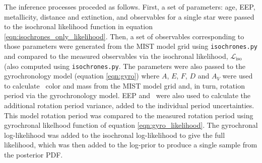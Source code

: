 The inference processes proceded as follows.
First, a set of parameters: age, EEP, metallicity, distance and extinction,
and observables for a single star were passed to the isochronal likelihood
function in equation \eqref{eqn:isochrones_only_likelihood}.
Then, a set of observables corresponding to those parameters were generated
from the MIST model grid using {\tt isochrones.py} and compared to the
measured observables via the isochronal likelihood,
$\mathcal{L}_{\mathrm{iso}}$ (also computed using {\tt isochrones.py}.
The parameters were also passed to the gyrochronology model (equation
\ref{eqn:gyro}) where $A$, $E$,
$F$, $D$ and $A_V$ were used to calculate \gcolor\ color and mass from the
MIST model grid and, in turn, rotation period via the gyrochronology model.
EEP and \gcolor\ were also used to calculate the additional rotation period
variance, added to the individual period uncertainties.
This model rotation period was compared to the measured rotation period using
gyrochronal likelhood function of equation \ref{eqn:gyro_likelihood}.
The gyrochronal log-likelihood was added to the isochronal log-likelihood to
give the full likelihood, which was then added to the log-prior to produce a
single sample from the posterior PDF.


